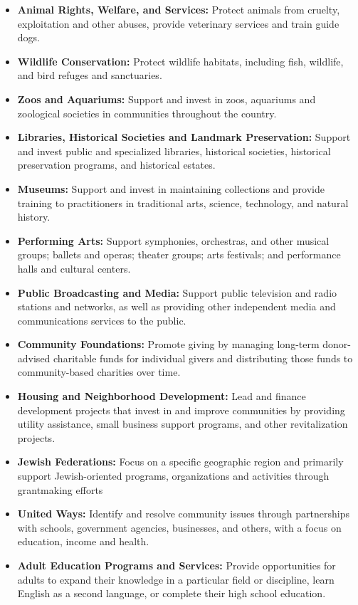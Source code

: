 \begin{itemize}
    \item \textbf{Animal Rights, Welfare, and Services:} Protect animals from cruelty, exploitation and other abuses, provide veterinary services and train guide dogs.
    \item \textbf{Wildlife Conservation:} Protect wildlife habitats, including fish, wildlife, and bird refuges and sanctuaries.
    \item \textbf{Zoos and Aquariums:} Support and invest in zoos, aquariums and zoological societies in communities throughout the country.
    \item \textbf{Libraries, Historical Societies and Landmark Preservation:} Support and invest public and specialized libraries, historical societies, historical preservation programs, and historical estates.
    \item \textbf{Museums:} Support and invest in maintaining collections and provide training to practitioners in traditional arts, science, technology, and natural history.
    \item \textbf{Performing Arts:} Support symphonies, orchestras, and other musical groups; ballets and operas; theater groups; arts festivals; and performance halls and cultural centers.
    \item \textbf{Public Broadcasting and Media:} Support public television and radio stations and networks, as well as providing other independent media and communications services to the public.
    \item \textbf{Community Foundations:} Promote giving by managing long-term donor-advised charitable funds for individual givers and distributing those funds to community-based charities over time.
    \item \textbf{Housing and Neighborhood Development:} Lead and finance development projects that invest in and improve communities by providing utility assistance, small business support programs, and other revitalization projects.
    \item \textbf{Jewish Federations:} Focus on a specific geographic region and primarily support Jewish-oriented programs, organizations and activities through grantmaking efforts
    \item \textbf{United Ways:} Identify and resolve community issues through partnerships with schools, government agencies, businesses, and others, with a focus on education, income and health.
    \item \textbf{Adult Education Programs and Services:} Provide opportunities for adults to expand their knowledge in a particular field or discipline, learn English as a second language, or complete their high school education.

\end{itemize}
